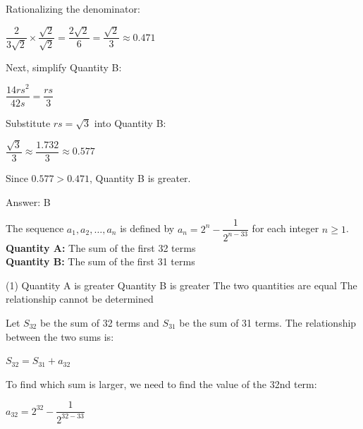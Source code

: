\documentclass[11pt,paper=a4,answers]{exam}
\begin{document}
\begin{questions}
\begin{solution}
Rationalizing the denominator:
\begin{center}
$\dfrac{2}{3\sqrt{2}} \times \dfrac{\sqrt{2}}{\sqrt{2}} = \dfrac{2\sqrt{2}}{6} = \dfrac{\sqrt{2}}{3} \approx 0.471$
\end{center}
\vspace{5pt}

Next, simplify Quantity B:
\begin{center}
$\dfrac{14rs^2}{42s} = \dfrac{rs}{3}$
\end{center}
\vspace{5pt}

Substitute $rs = \sqrt{3}$ into Quantity B:
\begin{center}
$\dfrac{\sqrt{3}}{3} \approx \dfrac{1.732}{3} \approx 0.577$
\end{center}
\vspace{5pt}

Since $0.577 > 0.471$, Quantity B is greater.

Answer: \colorbox{yellow!100}{B}
\end{solution}

\vspace{1cm}

\question
The sequence $a_1, a_2, \dots, a_n$ is defined by $a_n = 2^n - \dfrac{1}{2^{n-33}}$ for each integer $n \geq 1$.
\\[0.3cm]
\textbf{Quantity A: } The sum of the first 32 terms \\
\textbf{Quantity B: } The sum of the first 31 terms

\begin{tasks}(1)
\task[A)] Quantity A is greater
\task[B)] Quantity B is greater
\task[C)] The two quantities are equal
\task[D)] The relationship cannot be determined
\end{tasks}

\begin{solution}
Let $S_{32}$ be the sum of 32 terms and $S_{31}$ be the sum of 31 terms.
\vspace{5pt}
The relationship between the two sums is:
\begin{center}
$S_{32} = S_{31} + a_{32}$
\end{center}
\vspace{5pt}

To find which sum is larger, we need to find the value of the 32nd term:
\begin{center}
$a_{32} = 2^{32} - \dfrac{1}{2^{32-33}}$
\end{center}
\vspace{5pt}


\end{solution}
\end{questions}
\end{document}

